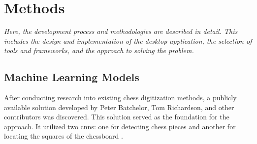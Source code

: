 \chapter{Methods}
\label{chp:methods}







\begin{center}
    \textit{Here, the development process and methodologies are described in detail. This includes the design and implementation of the desktop application, the selection of tools and frameworks, and the approach to solving the problem.}
\end{center}



\section{Machine Learning Models}
\label{sec:ml-models}

After conducting research into existing chess digitization methods, a publicly available solution developed by Peter Batchelor, Tom Richardson, and other contributors was discovered. This solution served as the foundation for the approach. It utilized two \glspl{cnn}: one for detecting chess pieces and another for locating the squares of the chessboard \cite{lichess:chesscam}. \\

